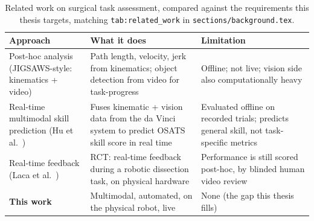 \documentclass[11pt]{article}
\begin{document}
\begin{table}[h]
\centering
\begin{tabular}{|p{3.3cm}|p{5.1cm}|p{4.3cm}|}
\hline
\textbf{Approach} & \textbf{What it does} & \textbf{Limitation} \\
\hline
Post-hoc analysis (JIGSAWS-style: kinematics + video) &
Path length, velocity, jerk from kinematics; object detection from
video for task-progress &
Offline; not live; vision side also computationally heavy \\[4pt]
\hline
Real-time multimodal skill prediction (Hu et al.~\cite{hu2026}) &
Fuses kinematic + vision data from the da Vinci system to predict OSATS
skill score in real time &
Evaluated offline on recorded trials; predicts general skill, not
task-specific metrics \\[4pt]
\hline
Real-time feedback (Laca et al.~\cite{laca2022}) &
RCT: real-time feedback during a robotic dissection task, on physical
hardware &
Performance is still scored post-hoc, by blinded human video review \\[4pt]
\hline
\textbf{This work} &
Multimodal, automated, on the physical robot, live &
None (the gap this thesis fills) \\
\hline
\end{tabular}
\caption{Related work on surgical task assessment, compared against the
requirements this thesis targets, matching \texttt{tab:related\_work}
in \texttt{sections/background.tex}.}
\label{tab:outline_related_work}
\end{table}
\end{document}
